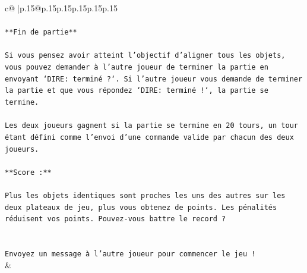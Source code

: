 \documentclass{article}
\begin{document}
{\begin{supertabular}{c@{$\;$}|p{.15\linewidth}@{}p{.15\linewidth}p{.15\linewidth}p{.15\linewidth}p{.15\linewidth}p{.15\linewidth}}
{{{\\ 
\\ 
\texttt{**Fin de partie**} \\
\\ 
\texttt{Si vous pensez avoir atteint l'objectif d'aligner tous les objets, vous pouvez demander à l'autre joueur de terminer la partie en envoyant `DIRE: terminé ?`. Si l'autre joueur vous demande de terminer la partie et que vous répondez `DIRE: terminé !`, la partie se termine.} \\
\\ 
\texttt{Les deux joueurs gagnent si la partie se termine en 20 tours, un tour étant défini comme l'envoi d'une commande valide par chacun des deux joueurs.} \\
\\ 
\texttt{**Score :**} \\
\\ 
\texttt{Plus les objets identiques sont proches les uns des autres sur les deux plateaux de jeu, plus vous obtenez de points. Les pénalités réduisent vos points. Pouvez{-}vous battre le record ?} \\
\\ 
\\ 
\texttt{Envoyez un message à l'autre joueur pour commencer le jeu !} \\
            }
        }
    }
    & \\ \\


\end{supertabular}}
\end{document}
